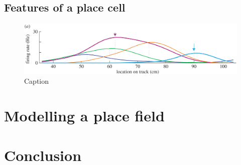 \subsection{Features of a place cell}

\begin{figure}
\centering
\includegraphics[width=\textwidth]{./gfx/Chapter05/dragoi_et_al_place_cell.png}
\caption{Caption}
\label{}
\end{figure}

\section{Modelling a place field}






\section{Conclusion}


